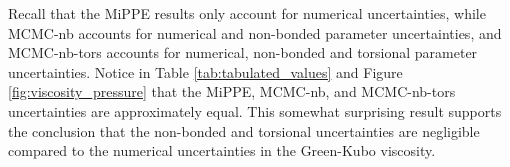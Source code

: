 \documentclass[preprint,review,12pt]{elsarticle}
\begin{document}
	Recall that the MiPPE results only account for numerical uncertainties, while MCMC-nb accounts for numerical and non-bonded parameter uncertainties, and MCMC-nb-tors accounts for numerical, non-bonded and torsional parameter uncertainties. Notice in Table \ref{tab:tabulated_values} and Figure \ref{fig:viscosity_pressure} that the MiPPE, MCMC-nb, and MCMC-nb-tors uncertainties are approximately equal. This somewhat surprising result supports the conclusion that the non-bonded and torsional uncertainties are negligible compared to the numerical uncertainties in the Green-Kubo viscosity. 
	
	
%	


%        
%
\end{document}
